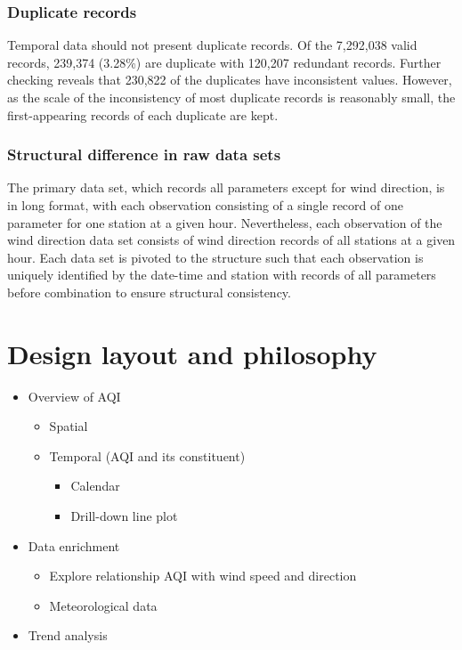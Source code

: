 \documentclass{aucklandthesis}
\begin{document}
\hypertarget{duplicate-records}{%
\subsection{Duplicate records}\label{duplicate-records}}

Temporal data should not present duplicate records. Of the 7,292,038 valid records, 239,374 (3.28\%) are duplicate with 120,207 redundant records. Further checking reveals that 230,822 of the duplicates have inconsistent values. However, as the scale of the inconsistency of most duplicate records is reasonably small, the first-appearing records of each duplicate are kept.

\hypertarget{structural-difference-in-raw-data-sets}{%
\subsection{Structural difference in raw data sets}\label{structural-difference-in-raw-data-sets}}

The primary data set, which records all parameters except for wind direction, is in long format, with each observation consisting of a single record of one parameter for one station at a given hour. Nevertheless, each observation of the wind direction data set consists of wind direction records of all stations at a given hour. Each data set is pivoted to the structure such that each observation is uniquely identified by the date-time and station with records of all parameters before combination to ensure structural consistency.

\hypertarget{ch:design}{%
\chapter{Design layout and philosophy}\label{ch:design}}

\begin{itemize}
\tightlist
\item
  Overview of AQI

  \begin{itemize}
  \tightlist
  \item
    Spatial
  \item
    Temporal (AQI and its constituent)

    \begin{itemize}
    \tightlist
    \item
      Calendar
    \item
      Drill-down line plot
    \end{itemize}
  \end{itemize}
\item
  Data enrichment

  \begin{itemize}
  \tightlist
  \item
    Explore relationship AQI with wind speed and direction
  \item
    Meteorological data
  \end{itemize}
\item
  Trend analysis
\end{itemize}
\end{document}
